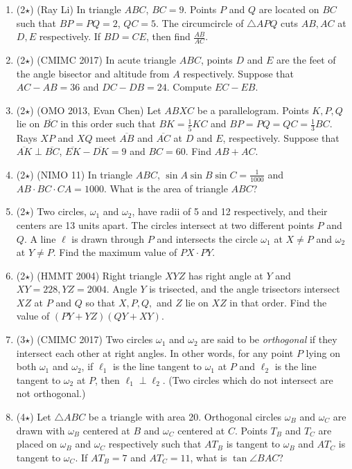\documentclass[11pt]{scrartcl}
\begin{document}
\begin{enumerate}
    \item (2$\star$) (Ray Li) In triangle $ABC$, $BC=9$. Points $P$ and $Q$ are located on $BC$ such that $BP=PQ=2$, $QC=5$. The circumcircle of $\triangle APQ$ cuts $AB, AC$ at $D, E$ respectively. If $BD=CE$, then find $\frac{AB}{AC}$.

    \item (2$\star$) (CMIMC 2017) In acute triangle $ABC$, points $D$ and $E$ are the feet of the angle bisector and altitude from $A$ respectively. Suppose that $AC-AB=36$ and $DC-DB=24$. Compute $EC-EB$.

    \item (2$\star$) (OMO 2013, Evan Chen) Let $ABXC$ be a parallelogram. Points $K,P,Q$ lie on $\overline{BC}$ in this order such that $BK = \frac{1}{5}KC$ and $BP=PQ=QC = \frac{1}{3}BC$. Rays $XP$ and $XQ$ meet $\overline{AB}$ and $\overline{AC}$ at $D$ and $E$, respectively. Suppose that $\overline{AK} \perp \overline{BC}$, $\overline{EK}-\overline{DK}=9$ and $BC=60$. Find $AB+AC$.

    \item (2$\star$) (NIMO 11) In triangle $ABC$, $\sin A \sin B \sin C = \frac{1}{1000}$ and $AB \cdot BC \cdot CA = 1000$. What is the area of triangle $ABC$? 

    \item (2$\star$) Two circles, $\omega_1$ and $\omega_2$, have radii of 5 and 12 respectively, and their centers are 13 units apart. The circles intersect at two different points $P$ and $Q$. A line $\ell$ is drawn through $P$ and intersects the circle $\omega_1$ at $X \neq P$ and $\omega_2$ at $Y \neq P$. Find the maximum value of $PX \cdot PY$.

    \item (2$\star$) (HMMT 2004) Right triangle $XYZ$ has right angle at $Y$ and $XY=228, YZ=2004$. Angle $Y$ is trisected, and the angle trisectors intersect $XZ$ at $P$ and $Q$ so that $X, P, Q,$ and $Z$ lie on $XZ$ in that order. Find the value of $(PY+YZ)(QY+XY)$.

    \item (3$\star$) (CMIMC 2017) Two circles $\omega_1$ and $\omega_2$ are said to be \textit{orthogonal} if they intersect each other at right angles. In other words, for any point $P$ lying on both $\omega_1$ and $\omega_2$, if $\ell_1$ is the line tangent to $\omega_1$ at $P$ and $\ell_2$ is the line tangent to $\omega_2$ at $P$, then $\ell_1 \perp \ell_2$. (Two circles which do not intersect are not orthogonal.)
    
    \item (4$\star$) Let $\triangle ABC$ be a triangle with area 20. Orthogonal circles $\omega_B$ and $\omega_C$ are drawn with $\omega_B$ centered at $B$ and $\omega_C$ centered at $C$. Points $T_B$ and $T_C$ are placed on $\omega_B$ and $\omega_C$ respectively such that $AT_B$ is tangent to $\omega_B$ and $AT_C$ is tangent to $\omega_C$. If $AT_B=7$ and $AT_C=11$, what is $\tan \angle BAC$?

\end{enumerate}
\end{document}

